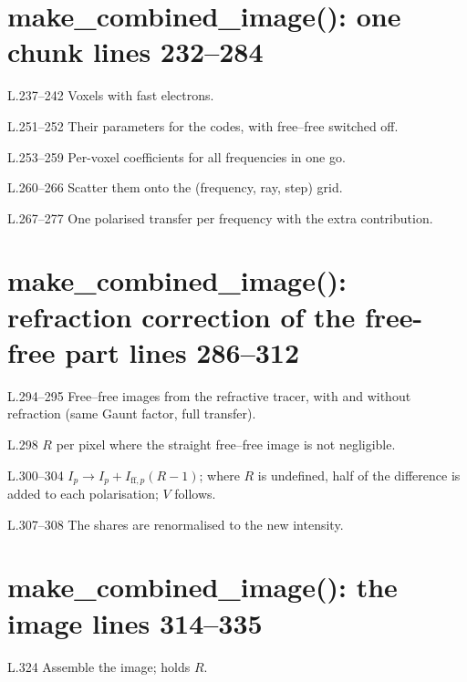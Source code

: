 \section*{\normalsize make\_combined\_image(): one chunk \hfill{\small\mdseries\color{gray}lines 232--284}}

\begin{lines}
\item[L.237–242] Voxels with fast electrons.
\item[L.251–252] Their parameters for the codes, with free--free switched off.
\item[L.253–259] Per-voxel coefficients for all frequencies in one go.
\item[L.260–266] Scatter them onto the (frequency, ray, step) grid.
\item[L.267–277] One polarised transfer per frequency with the extra contribution.
\end{lines}
\section*{\normalsize make\_combined\_image(): refraction correction of the free-free part \hfill{\small\mdseries\color{gray}lines 286--312}}

\begin{lines}
\item[L.294–295] Free--free images from the refractive tracer, with and without refraction (same Gaunt factor, full transfer).
\item[L.298] $R$ per pixel where the straight free--free image is not negligible.
\item[L.300–304] $I_p\to I_p+I_{\text{ff},p}(R-1)$; where $R$ is undefined, half of the difference is added to each polarisation; $V$ follows.
\item[L.307–308] The shares are renormalised to the new intensity.
\end{lines}
\section*{\normalsize make\_combined\_image(): the image \hfill{\small\mdseries\color{gray}lines 314--335}}

\begin{lines}
\item[L.324] Assemble the image;  holds $R$.
\end{lines}

